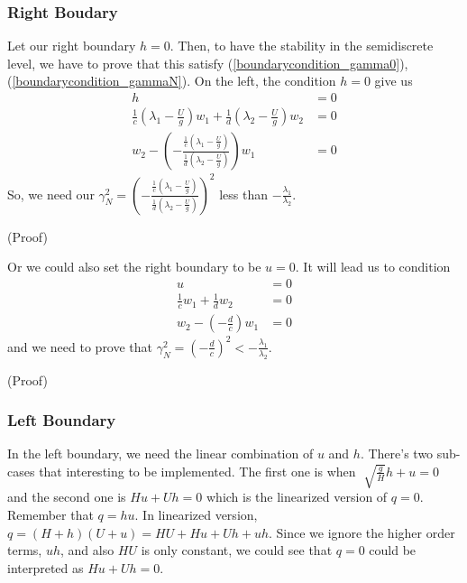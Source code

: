 \documentclass{article}
\theoremstyle{definition}
\begin{document}
        \subsubsection*{Right Boudary}
        Let our right boundary $h=0$. 
        Then, to have the stability in the semidiscrete level, we have to prove that this 
        satisfy (\ref{boundarycondition_gamma0}), (\ref{boundarycondition_gammaN}). 
        On the left, the condition $h=0$ give us  
        \begin{align}
            h &=0 \\
            \frac{1}{c}\left(\lambda_1 -\frac{ U}{g}\right) w_1 +  \frac{1}{d}\left(\lambda_2 -\frac{ U}{g}\right) w_2 & = 0 \\
            w_2 - \left(- \frac{\frac{1}{c}\left(\lambda_1 -\frac{ U}{g}\right)}{\frac{1}{d}\left(\lambda_2 -\frac{ U}{g}\right)} \right) w_1 &= 0 
        \end{align}
        So, we need our $\gamma_N^2 = \left(- \frac{\frac{1}{c}\left(\lambda_1 -\frac{ U}{g}\right)}{\frac{1}{d}\left(\lambda_2 -\frac{ U}{g}\right)} \right)^2$ 
        less than $-\frac{\lambda_1}{\lambda_2}$. 

        (Proof)

        Or we could also set the right boundary to be $u=0$. It will lead us to condition
        \begin{align}
            u &= 0 \\
            \frac{1}{c} w_1 + \frac{1}{d} w_2 & =0 \\
            w_2 - \left(- \frac{d}{c} \right) w_1 &= 0 \label{rightboundary:u}
        \end{align}
        and we need to prove that $\gamma_N^2 = \left(-\frac{d}{c}\right)^2 < -\frac{\lambda_1}{\lambda_2}$.

        (Proof)

        \subsubsection*{Left Boundary}
    In the left boundary, we need the linear combination of $u$ and $h$. 
    There's two sub-cases that interesting to be implemented. The first one 
    is when $\sqrt[]{\frac gH} h + u =0$ and the second one is $Hu + Uh = 0$ which is 
    the linearized version of $q = 0$. Remember that $q = hu$. In linearized version, $q = (H + h)(U+u) = HU + Hu + Uh + uh$. 
        Since we ignore the higher order terms, $uh$, and also $HU$ is only constant, we could 
        see that $q=0$ could be interpreted as $Hu + Uh = 0$.
\end{document}

